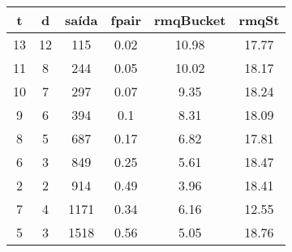 \begin{tabular}{|c|c|c|c|c|c|}
\hline
\textbf{t} & \textbf{d} & \textbf{saída} & \textbf{fpair} & \textbf{rmqBucket} & \textbf{rmqSt}\\
\hline
13 & 12 & 115 & 0.02 & 10.98 & 17.77\\
\hline
11 & 8 & 244 & 0.05 & 10.02 & 18.17\\
\hline
10 & 7 & 297 & 0.07 & 9.35 & 18.24\\
\hline
9 & 6 & 394 & 0.1 & 8.31 & 18.09\\
\hline
8 & 5 & 687 & 0.17 & 6.82 & 17.81\\
\hline
6 & 3 & 849 & 0.25 & 5.61 & 18.47\\
\hline
2 & 2 & 914 & 0.49 & 3.96 & 18.41\\
\hline
7 & 4 & 1171 & 0.34 & 6.16 & 12.55\\
\hline
5 & 3 & 1518 & 0.56 & 5.05 & 18.76\\
\hline
\end{tabular}
